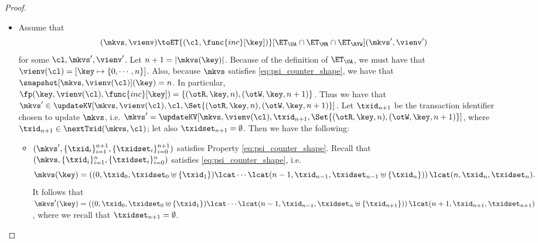 \begin{proof}
\begin{itemize}
\item 
Assume that
\[
(\mkvs, \vienv) \toET{(\cl, \func{inc}[\key])}[\ET_{\UA} \cap \ET_{\MR} \cap  \ET_{\RYW}] (\mkvs', \vienv')
\]
for some $\cl, \mkvs', \vienv'$. Let $n+1 = \lvert \mkvs(\key) \rvert$. Because of the definition of 
$\ET_{\UA}$, we must have that $\vienv(\cl) = [\key \mapsto \{0, \cdots, n\}]$. Also, 
because $\mkvs$ satisfies \eqref{eq:psi_counter_shape}, we have that $\snapshot[\mkvs, \vienv(\cl)](\key) = n$. 
In particular, $\fp(\key, \vienv(\cl), \func{inc}[\key]) = \{(\otR, \key, n), (\otW, \key, n+1)\}$. 
Thus we have that $\mkvs' \in \updateKV[\mkvs, \vienv(\cl), \cl, \Set{(\otR, \key, n), (\otW, \key, n+1)}]$. 
Let $\txid_{n+1}$ be the transaction identifier 
chosen to update $\mkvs$, i.e. $\mkvs' = \updateKV[\mkvs, \vienv(\cl), \txid_{n+1}, \Set{(\otR, \key, n), (\otW, \key, n+1)}]$, 
where $\txid_{n+1} \in \nextTxid(\mkvs, \cl)$; 
let also $\txidset_{n+1} = \emptyset$. Then we have the following: 
\begin{itemize}
\item  $(\mkvs', \{\txid_{i}\}_{i=1}^{n+1}, \{\txidset_{i}\}_{i=0}^{n+1})$ satisfies Property \eqref{eq:psi_counter_shape}. 
Recall that $(\mkvs, \{\txid_{i}\}_{i=1}^{n}, \{\txidset_{i}\}_{i=0}^{n})$ satisfies \eqref{eq:psi_counter_shape}, 
i.e.
\[\mkvs(\key) = \left( (0, \txid_{0}, \txidset_{0} \uplus \{\txid_1\}) \lcat \cdots \lcat (n-1, \txid_{n-1}, \txidset_{n-1} \uplus \{\txid_{n}\}) \right) 
\lcat (n, \txid_{n}, \txidset_{n}).
\]
It follows that $\mkvs'(\key) = \left( (0, \txid_{0}, \txidset_{0} \uplus \{\txid_1\}) \lcat \cdots \lcat (n-1, \txid_{n-1}, \txidset_{n} \uplus \{\txid_{n+1}\}) \right) 
\lcat (n+1, \txid_{n+1}, \txidset_{n+1})$, 
where we recall that $\txidset_{n+1} = \emptyset$.


\end{itemize}
\end{itemize}
\end{proof}
